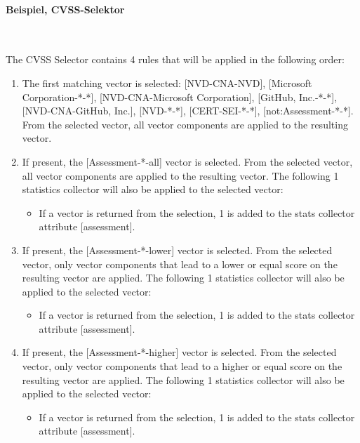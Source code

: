 \paragraph{Beispiel, CVSS-Selektor } \label{par:projektbericht-loesungsweg-cvss-selection-example-selector-context}

\

\noindent The CVSS Selector contains 4 rules that will be applied in the following order:
\begin{enumerate}[noitemsep]
    \item The first matching vector is selected: [NVD-CNA-NVD], [Microsoft Corporation-*-*], [NVD-CNA-Microsoft Corporation], [GitHub, Inc.-*-*], [NVD-CNA-GitHub, Inc.], [NVD-*-*], [CERT-SEI-*-*], [not:Assessment-*-*]. From the selected vector, all vector components are applied to the resulting vector.
    \item If present, the [Assessment-*-all] vector is selected. From the selected vector, all vector components are applied to the resulting vector. The following 1 statistics collector will also be applied to the selected vector:
    \begin{itemize}[noitemsep]
        \item If a vector is returned from the selection, 1 is added to the stats collector attribute [assessment].
    \end{itemize}
    \item If present, the [Assessment-*-lower] vector is selected. From the selected vector, only vector components that lead to a lower or equal score on the resulting vector are applied. The following 1 statistics collector will also be applied to the selected vector:
    \begin{itemize}[noitemsep]
        \item If a vector is returned from the selection, 1 is added to the stats collector attribute [assessment].
    \end{itemize}
    \item If present, the [Assessment-*-higher] vector is selected. From the selected vector, only vector components that lead to a higher or equal score on the resulting vector are applied. The following 1 statistics collector will also be applied to the selected vector:
    \begin{itemize}[noitemsep]
        \item If a vector is returned from the selection, 1 is added to the stats collector attribute [assessment].
    \end{itemize}
\end{enumerate}

